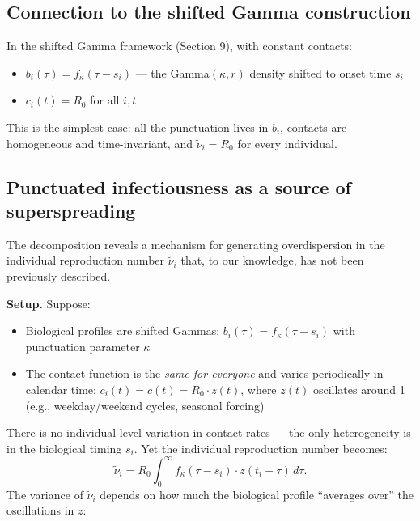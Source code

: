 \documentclass[11pt]{article}
\begin{document}
\subsection{Connection to the shifted Gamma construction}

In the shifted Gamma framework (Section 9), with constant contacts:
\begin{itemize}
\item $b_i(\tau) = f_\kappa(\tau - s_i)$ --- the Gamma$(\kappa, r)$ density shifted to onset time $s_i$
\item $c_i(t) = R_0$ for all $i, t$
\end{itemize}

This is the simplest case: all the punctuation lives in $b_i$, contacts are homogeneous and time-invariant, and $\tilde{\nu}_i = R_0$ for every individual.

\subsection{Punctuated infectiousness as a source of superspreading}

The decomposition reveals a mechanism for generating overdispersion in the individual reproduction number $\tilde{\nu}_i$ that, to our knowledge, has not been previously described.

\textbf{Setup.} Suppose:
\begin{itemize}
\item Biological profiles are shifted Gammas: $b_i(\tau) = f_\kappa(\tau - s_i)$ with punctuation parameter $\kappa$
\item The contact function is the \textit{same for everyone} and varies periodically in calendar time: $c_i(t) = c(t) = R_0 \cdot z(t)$, where $z(t)$ oscillates around 1 (e.g., weekday/weekend cycles, seasonal forcing)
\end{itemize}

There is no individual-level variation in contact rates --- the only heterogeneity is in the biological timing $s_i$. Yet the individual reproduction number becomes:
\[
\tilde{\nu}_i = R_0 \int_0^\infty f_\kappa(\tau - s_i) \cdot z(t_i + \tau)\,d\tau.
\]
The variance of $\tilde{\nu}_i$ depends on how much the biological profile ``averages over'' the oscillations in $z$:
\end{document}
